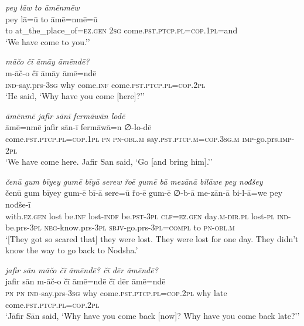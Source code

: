 \ea \label{ŠJ.32}
\textit{pey lāw to āmēnmēw} \\ 
\gll pey lā=ū to āmē=nmē=ū \\ 
 to at\_the\_place\_of\textsc{=ez.gen} \textsc{2sg} come\textsc{.pst}\textsc{.ptcp}\textsc{.pl}\textsc{=cop}\textsc{.\textsc{1pl}}=and \\ 
\glt `We have come to you.’'
\z 
 
\ea \label{ŠJ.35}
\textit{māčo čī āmāy āmēndē?} \\ 
\gll m-āč-o čī āmāy āmē=ndē \\ 
 \textsc{ind-}say.prs\textsc{-3sg} why come\textsc{.inf} come\textsc{.pst}\textsc{.ptcp}\textsc{.pl}\textsc{=cop}.\textsc{2pl} \\ 
\glt `He said, ‘Why have you come [here]?’'
\z 
 
\ea \label{ŠJ.36}
\textit{āmēnmē jafir sānī fermāwān lodē} \\ 
\gll āmē=nmē jafir sān-ī fermāwā=n ∅-lo-dē \\ 
 come\textsc{.pst}\textsc{.ptcp}\textsc{.pl}\textsc{=cop}\textsc{.\textsc{1pl}} \textsc{pn} \textsc{pn}\textsc{-obl}\textsc{.m} say\textsc{.pst}\textsc{.ptcp}\textsc{.m}\textsc{=cop}\textsc{.3sg}\textsc{.m} \textsc{imp-}go.prs.\textsc{imp-}\textsc{2pl} \\ 
\glt `We have come here. Jafir San said, ‘Go [and bring him].’'
\z 
 
\ea \label{ŠJ.39}
\textit{čenū gum bīyey gumē bīyā serew řoē gumē bā mezānā bilāwe pey nođšey} \\ 
\gll čenū gum bīyey gum-ē bī-ā sere=ū řo-ē gum-ē ∅-b-ā me-zān-ā bi-l-ā=we pey nođše-ī \\ 
 with\textsc{.ez.gen} lost be\textsc{.inf} lost\textsc{-indf} be\textsc{.pst}\textsc{-3pl} \textsc{clf}\textsc{=ez.gen} day\textsc{.m}\textsc{-dir}\textsc{.pl} lost\textsc{\textsc{-pl}} \textsc{ind-}be.prs\textsc{-3pl} \textsc{neg-}know.prs\textsc{-3pl} \textsc{sbjv-}go.prs\textsc{-3pl}\textsc{=compl} to \textsc{pn}\textsc{-obl}\textsc{.m} \\ 
\glt `[They got so scared that] they were lost. They were lost for one day. They didn’t know the way to go back to Nodsha.'
\z 
 
\ea \label{ŠJ.43}
\textit{jafir sān māčo čī āmēndē? čī dēr āmēndē?} \\ 
\gll jafir sān m-āč-o čī āmē=ndē čī dēr āmē=ndē \\ 
 \textsc{pn} \textsc{pn} \textsc{ind-}say.prs\textsc{-3sg} why come\textsc{.pst}\textsc{.ptcp}\textsc{.pl}\textsc{=cop}.\textsc{2pl} why late come\textsc{.pst}\textsc{.ptcp}\textsc{.pl}\textsc{=cop}.\textsc{2pl} \\ 
\glt `Jāfir Sān said, ‘Why have you come back [now]? Why have you come back late?’'
\z 
 
